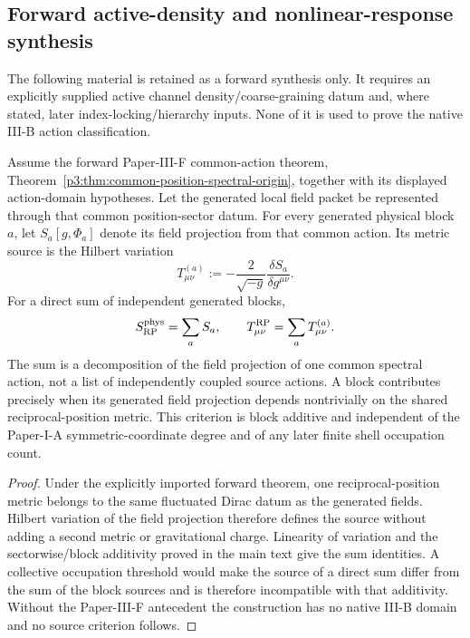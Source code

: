 \documentclass[11pt,a4paper]{article}
\begin{document}
\subsection{Forward active-density and nonlinear-response synthesis}
\label{p3b:app:forward-synthesis}
The following material is retained as a forward synthesis only.  It requires
an explicitly supplied active channel density/coarse-graining datum and, where
stated, later index-locking/hierarchy inputs.  None of it is used to prove the
native III-B action classification.

\begin{corollary}
\label{p3:cor:reciprocal-position-source-criterion}
Assume the forward Paper-III-F common-action theorem,
Theorem~\ref{p3:thm:common-position-spectral-origin}, together with its
displayed action-domain hypotheses.  Let the generated local field packet be
represented through that common position-sector datum.  For every generated
physical block \(a\), let \(S_a[g,\Phi_a]\) denote its field projection from
that common action.  Its metric source is the Hilbert variation
\[
  T^{(a)}_{\mu\nu}
  :=-\frac{2}{\sqrt{-g}}\frac{\delta S_a}{\delta g^{\mu\nu}}.
\]
For a direct sum of independent generated blocks,
\[
  S_{\rm RP}^{\rm phys}=\sum_a S_a,
  \qquad
  T_{\mu\nu}^{\rm RP}=\sum_a T^{(a)}_{\mu\nu}.
\]
The sum is a decomposition of the field projection of one common spectral
action, not a list of independently coupled source actions.  A block
contributes precisely when its generated field projection depends
nontrivially on the shared reciprocal-position metric.  This criterion is
block additive and independent of the Paper-I-A symmetric-coordinate degree and
of any later finite shell occupation count.
\end{corollary}

\begin{proof}
Under the explicitly imported forward theorem, one reciprocal-position metric
belongs to the same fluctuated Dirac datum as the generated fields.  Hilbert
variation of the field projection therefore defines the source without adding
a second metric or gravitational charge.  Linearity of variation and the
sectorwise/block additivity proved in the main text give the sum identities.
A collective occupation threshold would make the source of a direct sum
differ from the sum of the block sources and is therefore incompatible with
that additivity.  Without the Paper-III-F antecedent the construction has no
native III-B domain and no source criterion follows.
\end{proof}
\end{document}
